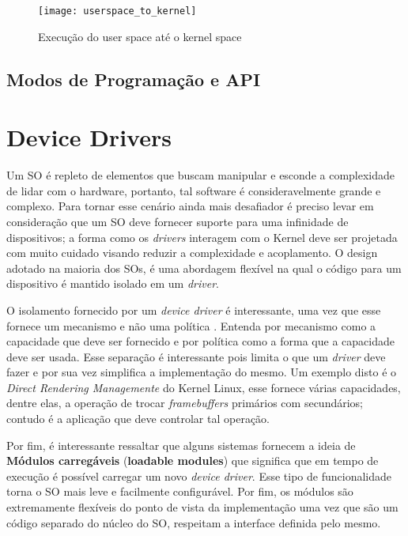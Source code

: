 \begin{figure}[!h]
  \centering
  \texttt{[image: userspace\_to\_kernel]} 
  \caption{Execução do user space até o kernel space}
  \label{fig:userspace_kernelspace}
\end{figure}

\subsection{Modos de Programação e API}

\section{Device Drivers}
\label{sec:dd}

Um SO é repleto de elementos que buscam manipular e esconde a complexidade de
lidar com o hardware, portanto, tal software é consideravelmente grande e
complexo. Para tornar esse cenário ainda mais desafiador é preciso levar em
consideração que um SO deve fornecer suporte para uma infinidade de
dispositivos; a forma como os \emph{drivers} interagem com o Kernel deve ser
projetada com muito cuidado visando reduzir a complexidade e acoplamento.  O
design adotado na maioria dos SOs, é uma abordagem flexível na qual o código
para um dispositivo é mantido isolado em um \emph{driver}.

O isolamento fornecido por um \emph{device driver} é interessante, uma vez que
esse fornece um mecanismo e não uma política \cite{ddbook}. Entenda por
mecanismo como a capacidade que deve ser fornecido e por política como a forma
que a capacidade deve ser usada. Esse separação é interessante pois limita o
que um \emph{driver} deve fazer e por sua vez simplifica a implementação do
mesmo. Um exemplo disto é o \emph{Direct Rendering Managemente} do Kernel
Linux, esse fornece várias capacidades, dentre elas, a operação de trocar
\emph{framebuffers} primários com secundários; contudo é a aplicação que deve
controlar tal operação.

Por fim, é interessante ressaltar que alguns sistemas fornecem a ideia de
\textbf{Módulos carregáveis} (\textbf{loadable modules}) que significa que em
tempo de execução é possível carregar um novo \emph{device driver}. Esse tipo
de funcionalidade torna o SO mais leve e facilmente configurável. Por fim, os
módulos são extremamente flexíveis do ponto de vista da implementação uma vez
que são um código separado do núcleo do SO, respeitam a interface definida pelo
mesmo.

